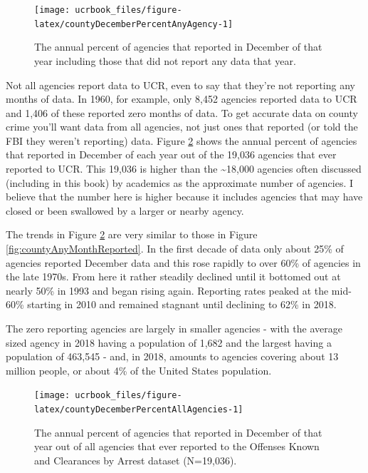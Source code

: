 \documentclass[
  12pt,
  openany]{book}
\begin{document}
\begin{figure}

{\centering \texttt{[image: ucrbook\_files/figure-latex/countyDecemberPercentAnyAgency-1]} 

}

\caption{The annual percent of agencies that reported in December of that year including those that did not report any data that year.}\label{fig:countyDecemberPercentAnyAgency}
\end{figure}

Not all agencies report data to UCR, even to say that they're not reporting any months of data. In 1960, for example, only 8,452 agencies reported data to UCR and 1,406 of these reported zero months of data. To get accurate data on county crime you'll want data from all agencies, not just ones that reported (or told the FBI they weren't reporting) data. Figure \ref{fig:countyDecemberPercentAllAgencies} shows the annual percent of agencies that reported in December of each year out of the 19,036 agencies that ever reported to UCR. This 19,036 is higher than the \textasciitilde18,000 agencies often discussed (including in this book) by academics as the approximate number of agencies. I believe that the number here is higher because it includes agencies that may have closed or been swallowed by a larger or nearby agency.

The trends in Figure \ref{fig:countyDecemberPercentAllAgencies} are very similar to those in Figure \ref{fig:countyAnyMonthReported}. In the first decade of data only about 25\% of agencies reported December data and this rose rapidly to over 60\% of agencies in the late 1970s. From here it rather steadily declined until it bottomed out at nearly 50\% in 1993 and began rising again. Reporting rates peaked at the mid-60\% starting in 2010 and remained stagnant until declining to 62\% in 2018.

The zero reporting agencies are largely in smaller agencies - with the average sized agency in 2018 having a population of 1,682 and the largest having a population of 463,545 - and, in 2018, amounts to agencies covering about 13 million people, or about 4\% of the United States population.

\begin{figure}

{\centering \texttt{[image: ucrbook\_files/figure-latex/countyDecemberPercentAllAgencies-1]} 

}

\caption{The annual percent of agencies that reported in December of that year out of all agencies that ever reported to the Offenses Known and Clearances by Arrest dataset (N=19,036).}\label{fig:countyDecemberPercentAllAgencies}
\end{figure}
\end{document}
